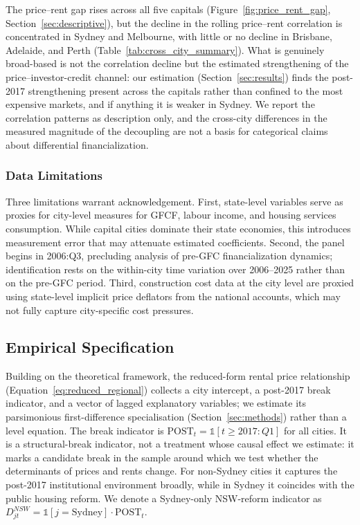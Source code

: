 \documentclass[preprint,11pt,authoryear]{elsarticle}
\begin{document}
The price--rent gap rises across all five capitals
(Figure~\ref{fig:price_rent_gap}, Section~\ref{sec:descriptive}), but
the decline in the rolling price--rent correlation is concentrated in
Sydney and Melbourne, with little or no decline in Brisbane, Adelaide,
and Perth (Table~\ref{tab:cross_city_summary}). What is genuinely broad-based
is not the correlation decline but the estimated strengthening of the
price--investor-credit channel: our estimation
(Section~\ref{sec:results}) finds the post-2017 strengthening present
across the capitals rather than confined to the most expensive markets,
and if anything it is weaker in Sydney. We report the correlation
patterns as description only, and the cross-city differences in the
measured magnitude of the decoupling are not a basis for categorical
claims about differential financialization.

\subsubsection{Data Limitations}

Three limitations warrant acknowledgement. First, state-level variables
serve as proxies for city-level measures for GFCF, labour income, and
housing services consumption. While capital cities dominate their state
economies, this introduces measurement error that may attenuate
estimated coefficients. Second, the panel begins in 2006:Q3,
precluding analysis of pre-GFC financialization dynamics; identification
rests on the within-city time variation over 2006--2025 rather than on
the pre-GFC period. Third, construction cost data at the city level are proxied
using state-level implicit price deflators from the national accounts,
which may not fully capture city-specific cost pressures.

\subsection{Empirical Specification}

Building on the theoretical framework, the reduced-form rental price
relationship (Equation~\ref{eq:reduced_regional}) collects a city
intercept, a post-2017 break indicator, and a vector of lagged
explanatory variables; we estimate its parsimonious first-difference
specialisation (Section~\ref{sec:methods}) rather than a level equation.
The break indicator is
$\text{POST}_{t}=\mathds{1}[t\geq 2017\mathrm{:}Q1]$ for all cities. It
is a structural-break indicator, not a treatment whose causal effect we
estimate: it marks a candidate break in the sample around which we test
whether the determinants of prices and rents change. For non-Sydney
cities it captures the post-2017 institutional environment broadly, while
in Sydney it coincides with the public housing reform. We denote a
Sydney-only NSW-reform indicator as
$D_{jt}^{NSW}=\mathds{1}[j=\text{Sydney}]\cdot \text{POST}_{t}$.
\end{document}
